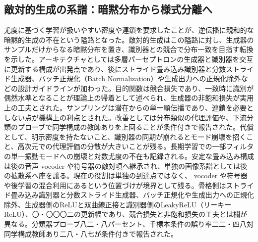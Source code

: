 \documentclass[lualatex,a4paper,10pt]{jlreq}
\begin{document}
\subsection{敵対的生成の系譜：暗黙分布から様式分離へ}
尤度に基づく学習が扱いやすい密度や連鎖を要求したことが、逆伝播に親和的な暗黙的生成の不在という隘路となった。敵対的生成はこの隘路に対し、生成器のサンプルだけからなる暗黙分布を置き、識別器との競合で分布一致を目指す転換を示した\autocite{btd013}。アーキテクチャとしては多層パーセプトロンの生成器と識別器を交互に更新する構成が出発点であり、後にストライド畳み込み識別器と分数ストライド生成器、バッチ正規化（Batch Normalization）や生成出力への正規化除外などの設計ガイドラインが加わった\autocite{btd014}。目的関数は競合損失であり、一致時に識別が偶然水準となることが理論上の帰着として述べられ、生成器の非飽和損失が実用上の工夫とされた\autocite{btd013}。サンプリングは潜在からの単一順伝播であり、連鎖を必要としない点が機構上の利点とされた\autocite{btd013}。改善としては分布類似の代理評価や、下流分類のプローブで同学構成の教師ありを上回ることが条件付きで報告された\autocite{btd013,btd014}。代償として、明示密度を持たないこと、識別器の同期が崩れるとモード崩壊を招くこと、高次元での代理評価の分散が大きいことが残る。長期学習での一部フィルタの単一振動モードへの崩壊と対数尤度の不在も記録される。安定な畳み込み構成は後の音声 vocoder や符号器の敵対項へ継承され、単独の画像系譜としては後の拡散系へ座を譲る。現在の役割は単独の到達点ではなく、 vocoder や符号器や後学習の混合利用にあるという位置づけが境界として残る。骨格側はストライド畳み込み識別器と分数ストライド生成器、バッチ正規化や生成出力への正規化除外、生成器側のReLUと双曲線正接と識別器側のLeakyReLU（リーキーReLU）、〇・〇〇〇二の更新幅であり、競合損失と非飽和損失の工夫とは欄が異なる\autocite{btd013,btd014}。分類器プローブ八二・八パーセント、千標本条件の誤り率二二・四八対同学構成教師あり二八・八七が条件付きで報告された\autocite{btd014}。
\end{document}
